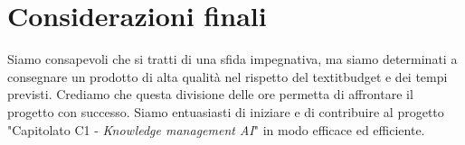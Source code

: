 \section{Considerazioni finali}

Siamo consapevoli che si tratti di una sfida impegnativa, ma siamo determinati a
consegnare un prodotto di alta qualità nel rispetto del textit{budget} e dei tempi
previsti. Crediamo che questa divisione delle ore permetta di affrontare il
progetto con successo. Siamo entuasiasti di iniziare e di contribuire al
progetto "Capitolato C1 - \textit{Knowledge management AI}" in modo efficace ed
efficiente.
